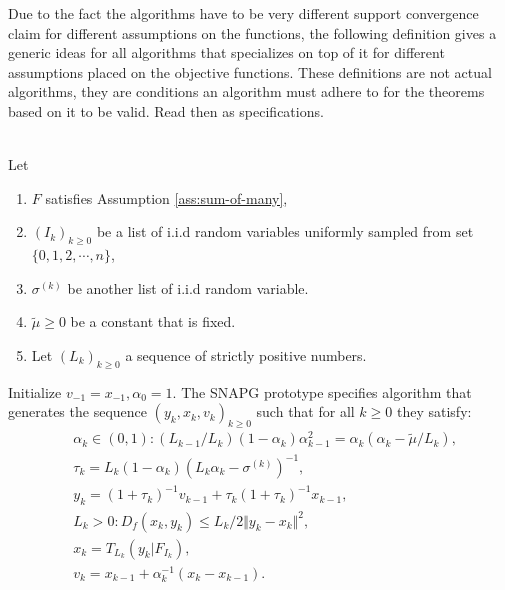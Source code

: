 \documentclass[12pt]{article}
\begin{document}
    Due to the fact the algorithms have to be very different support convergence claim for different assumptions on the functions, the following definition gives a generic ideas for all algorithms that specializes on top of it for different assumptions placed on the objective functions. 
    These definitions are not actual algorithms, they are conditions an algorithm must adhere to for the theorems based on it to be valid. 
    Read then as specifications. 
    \begin{definition}\;\label{def:snapg-v2-proto}\\
        Let 
        \begin{enumerate}[nosep]
            \item $F$ satisfies Assumption \ref{ass:sum-of-many}, 
            \item $(I_k)_{k \ge 0}$ be a list of i.i.d random variables uniformly sampled from set $\{0, 1, 2, \cdots, n\}$, 
            \item $\sigma^{(k)}$ be another list of i.i.d random variable. 
            \item $\tilde \mu \ge 0$ be a constant that is fixed.
            \item Let $(L_k)_{k \ge 0}$ a sequence of strictly positive numbers. 
        \end{enumerate}
        Initialize $v_{-1} = x_{-1}, \alpha_0 = 1$. 
        The SNAPG prototype specifies algorithm that generates the sequence $(y_k, x_k, v_k)_{k \ge 0}$ such that for all $k \ge 0$ they satisfy: 
        \begin{align*}
            & \alpha_k \in (0, 1): (L_{k - 1}/L_k)(1 - \alpha_{k})\alpha_{k - 1}^2 = \alpha_{k}\left(\alpha_{k} - \tilde \mu/L_k\right), \\
            & \tau_k = L_k(1 - \alpha_k)\left(L_k \alpha_k - \sigma^{(k)}\right)^{-1}, \\
            & y_k = (1 + \tau_k)^{-1}v_{k - 1} + \tau_k(1 + \tau_k)^{-1}x_{k - 1}, \\
            & L_k > 0: D_f(x_k, y_k) \le L_k/2\Vert y_k - x_k\Vert^2, \\
            & x_k =  T_{L_k}(y_k | F_{I_k}), \\
            & v_k = x_{k - 1} + \alpha_k^{-1}(x_k - x_{k - 1}). 
        \end{align*}
    \end{definition}
\end{document}
